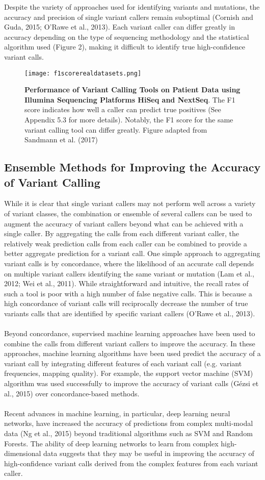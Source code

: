 \documentclass{article}
\begin{document}
Despite the variety of approaches used for identifying variants and mutations,  the accuracy and precision of single variant callers remain suboptimal (Cornish and Guda, 2015; O'Rawe et al., 2013). Each variant caller can differ greatly in accuracy depending on the type of sequencing methodology and the statistical algorithm used (Figure 2), making it difficult to identify true high-confidence variant calls.
\begin{figure}[H]
\texttt{[image: f1scorerealdatasets.png]}
\centering
\caption{\textbf{Performance of Variant Calling Tools on Patient Data using Illumina Sequencing Platforms HiSeq and NextSeq}. The F1 score indicates how well a caller can predict true positives (See Appendix 5.3 for more details). Notably, the F1 score for the same variant calling tool can differ greatly. Figure adapted from Sandmann et al. (2017)}
\end{figure}
\subsection{Ensemble Methods for Improving the Accuracy of Variant Calling} 
While it is clear that single variant callers may not perform well across a variety of variant classes, the combination or ensemble of several callers can be used to augment the accuracy of variant callers beyond what can be achieved with a single caller. By aggregating the calls from each different variant caller, the relatively weak prediction calls from each caller can be combined to provide a better aggregate prediction for a variant call. 
One simple approach to aggregating variant calls is by concordance, where the likelihood of an accurate call depends on multiple variant callers identifying the same variant or mutation (Lam et al., 2012; Wei et al., 2011). While straightforward and intuitive, the recall rates of such a tool is poor with a high number of false negative calls. This is because a high concordance of variant calls will reciprocally decrease the number of true variants calls that are identified by specific variant callers (O'Rawe et al., 2013). \\\\ Beyond concordance, supervised machine learning approaches have been used to combine the calls from different variant callers to improve the accuracy. In these approaches, machine learning algorithms have been used predict the accuracy of a variant call by integrating different features of each variant call (e.g. variant frequencies, mapping quality). For example, the support vector machine (SVM) algorithm was used successfully to improve the accuracy of variant calls (Gézsi et al., 2015) over concordance-based methods. \\\\ Recent advances in machine learning, in particular, deep learning neural networks, have increased the accuracy of predictions from complex multi-modal data (Ng et al., 2015) beyond traditional algorithms such as SVM and Random Forests. The ability of deep learning networks to learn from complex high-dimensional data suggests that they may be useful in improving the accuracy of high-confidence variant calls derived from the complex features from each variant caller. 
\end{document}
